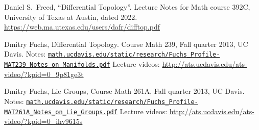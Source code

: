 \begin{thebibliography}{99}
  Daniel S.~Freed,
  ``Differential Topology''.
  Lecture Notes for Math course 392C, University of Texas at Austin, dated 2022.\newline
  \url{https://web.ma.utexas.edu/users/dafr/difftop.pdf}

  Dmitry Fuchs,
  Differential Topology.
  Course Math 239, Fall quarter 2013, UC Davis.\newline
  Notes: \href{https://www.math.ucdavis.edu/static/research/Fuchs_Profile-MAT239_Notes_on_Manifolds.pdf}{\mbox{\texttt{math.ucdavis.edu/static/research/Fuchs\_Profile-MAT239\_Notes\_on\_Manifolds.pdf}}}\newline
  Lecture videos: \url{http://ats.ucdavis.edu/ats-video/?kpid=0_9p81ge3t}

  Dmitry Fuchs,
  Lie Groups,
  Course Math 261A, Fall quarter 2013, UC Davis.\newline
  Notes: \href{https://www.math.ucdavis.edu/static/research/Fuchs_Profile-MAT261A_Notes_on_Lie_Groups.pdf}{\mbox{\texttt{math.ucdavis.edu/static/research/Fuchs\_Profile-MAT261A\_Notes\_on\_Lie\_Groups.pdf}}}
  Lecture videos: \url{http://ats.ucdavis.edu/ats-video/?kpid=0_ihv9615s}


\end{thebibliography}
